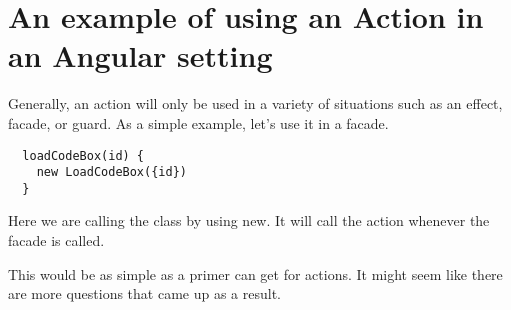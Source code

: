 \section{An example of using an Action in an Angular setting}
Generally, an action will only be used in a variety of situations such as an effect, facade, or guard. As a simple example, let's use it in a facade.

\begin{lstlisting}
  loadCodeBox(id) {
    new LoadCodeBox({id})
  }
\end{lstlisting}

Here we are calling the class by using new. It will call the action whenever the facade is called.

This would be as simple as a primer can get for actions. It might seem like there are more questions that came up as a result.
